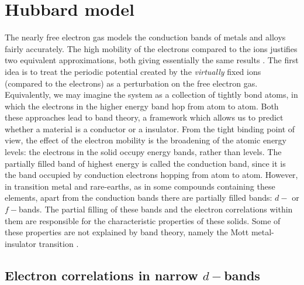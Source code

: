 \section{Hubbard model}\label{sec:hubbardModel}

The nearly free electron gas models the conduction bands of metals and alloys fairly accurately. The high mobility of the electrons compared to the ions justifies two equivalent approximations, both giving essentially the same results \cite{Ashcroft1976}. The first idea is to treat the periodic potential created by the \emph{virtually} fixed ions (compared to the electrons) as a perturbation on the free electron gas. Equivalently, we may imagine the system as a collection of tightly bond atoms, in which the electrons in the higher energy band hop from atom to atom. Both these approaches lead to band theory, a framework which allows us to predict whether a material is a conductor or a insulator. From the tight binding point of view, the effect of the electron mobility is the broadening of the atomic energy levels: the electrons in the solid occupy energy bands, rather than levels. The partially filled band of highest energy is called the conduction band, since it is the band occupied by conduction electrons hopping from atom to atom. However, in transition metal and rare-earths, as in some compounds containing these elements, apart from the conduction bands there are partially filled bands: $d-$ or $f-$bands. The partial filling of these bands and the electron correlations within them are responsible for the characteristic properties of these solids. Some of these properties are not explained by band theory, namely the Mott metal-insulator transition \cite{Boer1937, Mott1939, Mott1949}.

\subsection{Electron correlations in narrow $d-$bands}


